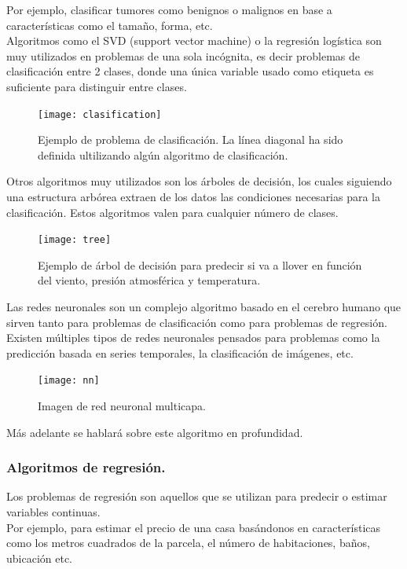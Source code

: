 \documentclass[a4paper,11pt]{article}
\begin{document}
\noindent
Por ejemplo, clasificar tumores como benignos o malignos en base a características como el tamaño, forma, etc.\\

\noindent
Algoritmos como el SVD (support vector machine) o la regresión logística son muy utilizados en problemas de una sola incógnita, es decir problemas de clasificación entre 2 clases, donde una única variable usado como etiqueta es suficiente para distinguir entre clases. 
\begin{figure}[H]
\centering
\texttt{[image: clasification]}
\caption{Ejemplo de problema de clasificación. La línea diagonal ha sido definida ultilizando algún algoritmo de clasificación.}
\end{figure}
\noindent
Otros algoritmos muy utilizados son los árboles de decisión, los cuales siguiendo una estructura arbórea extraen de los datos las condiciones necesarias para la clasificación. Estos algoritmos valen para cualquier número de clases.
\begin{figure}[H]
\centering
\texttt{[image: tree]}
\caption{Ejemplo de árbol de decisión para predecir si va a llover en función del viento, presión atmosférica y temperatura.}
\end{figure}
\noindent
Las redes neuronales son un complejo algoritmo basado en el cerebro humano que sirven tanto para problemas de clasificación como para problemas de regresión. \\

\noindent
Existen múltiples tipos de redes neuronales pensados para problemas como la predicción basada en series temporales, la clasificación de imágenes, etc.
\begin{figure}[H]
\centering
\texttt{[image: nn]}
\caption{Imagen de red neuronal multicapa.}
\end{figure}
\noindent
Más adelante se hablará sobre este algoritmo en profundidad.

\subsubsection{Algoritmos de regresión.}
Los problemas de regresión son aquellos que se utilizan para predecir o estimar variables continuas.\\

\noindent
Por ejemplo, para estimar el precio de una casa basándonos en características como los metros cuadrados de la parcela, el número de habitaciones, baños, ubicación etc.\\
\end{document}
